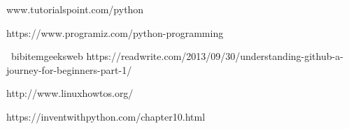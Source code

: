 \documentclass[12pt]{article}
\begin{document}





\newpage


\begin{thebibliography}{9}
 www.tutorialspoint.com/python
 

https://www.programiz.com/python-programming
 
\
bibitem{geeksweb} 
https://readwrite.com/2013/09/30/understanding-github-a-journey-for-beginners-part-1/

http://www.linuxhowtos.org/

https://inventwithpython.com/chapter10.html
\end{thebibliography}
 
\newpage
\end{document}
